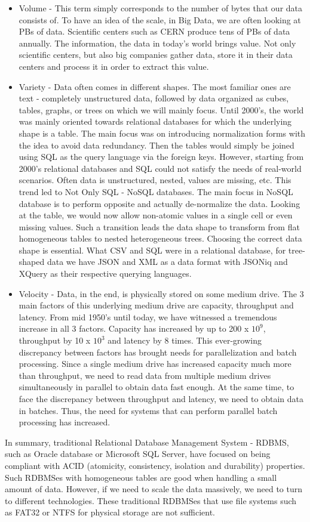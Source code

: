 \begin{itemize}
	\item Volume - This term simply corresponds to the number of bytes that our data consists of. To have an idea of the scale, in Big Data, we are often looking at PBs of data. Scientific centers such as CERN produce tens of PBs of data annually. The information, the data in today's world brings value. Not only scientific centers, but also big companies gather data, store it in their data centers and process it in order to extract this value.
	\item Variety - Data often comes in different shapes. The most familiar ones are text - completely unstructured data, followed by data organized as cubes, tables, graphs, or trees on which we will mainly focus. Until 2000's, the world was mainly oriented towards relational databases for which the underlying shape is a table. The main focus was on introducing normalization forms with the idea to avoid data redundancy. Then the tables would simply be joined using SQL as the query language via the foreign keys. However, starting from 2000's relational databases and SQL could not satisfy the needs of real-world scenarios. Often data is unstructured, nested, values are missing, etc. This trend led to Not Only SQL - NoSQL databases. The main focus in NoSQL database is to perform opposite and actually de-normalize the data. Looking at the table, we would now allow non-atomic values in a single cell or even missing values. Such a transition leads the data shape to transform from flat homogeneous tables to nested heterogeneous trees. Choosing the correct data shape is essential. What CSV and SQL were in a relational database, for tree-shaped data we have JSON and XML as a data format with JSONiq and XQuery as their respective querying languages.
	\item Velocity - Data, in the end, is physically stored on some medium drive. The 3 main factors of this underlying medium drive are capacity, throughput and latency. From mid 1950's until today, we have witnessed a tremendous increase in all 3 factors. Capacity has increased by up to 200 x $10^9$, throughput by 10 x $10^3$  and latency by 8 times. This ever-growing discrepancy between factors has brought needs for parallelization and batch processing. Since a single medium drive has increased capacity much more than throughput, we need to read data from multiple medium drives simultaneously in parallel to obtain data fast enough. At the same time, to face the discrepancy between throughput and latency, we need to obtain data in batches. Thus, the need for systems that can perform parallel batch processing has increased.
\end{itemize}
In summary, traditional Relational Database Management System - RDBMS, such as Oracle database or Microsoft SQL Server, have focused on being compliant with ACID (atomicity, consistency, isolation and durability) properties. Such RDBMSes with homogeneous tables are good when handling a small amount of data. However, if we need to scale the data massively, we need to turn to different technologies. These traditional RDBMSes that use file systems such as FAT32 or NTFS for physical storage are not sufficient. \cite{BigDataCourse} %

